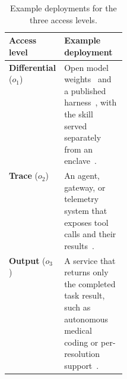 \documentclass[letterpaper,twocolumn,10pt]{article}
\newcommand{\emptySkill}{\varnothing}
\begin{document}
%
%
%
%
\begin{table}[t]
  \centering
  \footnotesize
  \caption{Example deployments for the three access levels.}
  \label{tab:threat-models}
  \begin{tabularx}{\linewidth}{@{}>{\raggedright\arraybackslash}p{0.23\linewidth}Y@{}}
    \toprule
    Access level & Example deployment \\
    \midrule
    \textbf{Differential} ($o_1$)
      & Open model weights~\cite{openweights} and a published
        harness~\cite{openhands}, with the skill served separately from an
        enclave~\cite{enclaves}. \\
    \textbf{Trace} ($o_2$)
      & An agent, gateway, or telemetry system that exposes tool calls and their
        results~\cite{geminicli,claudecode,aigateway,otelgenai}. \\
    \textbf{Output} ($o_3$)
      & A service that returns only the completed task result, such as autonomous
        medical coding or per-resolution support~\cite{nym,intercomfin}. \\
    \bottomrule
  \end{tabularx}
\end{table}
\end{document}
